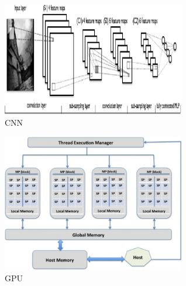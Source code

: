 \documentclass[sigconf]{acmart}
\begin{document}
\begin{figure}[htp]
\centering
\includegraphics[width=80mm]{images/paper1-fig2.png}
\caption{CNN}
\label{fig:2}
\end{figure}

\begin{figure}[htp]
\centering
\includegraphics[width=80mm]{images/paper1-figure3.png}
\caption{GPU}
\label{fig:3}
\end{figure}
\end{document}
